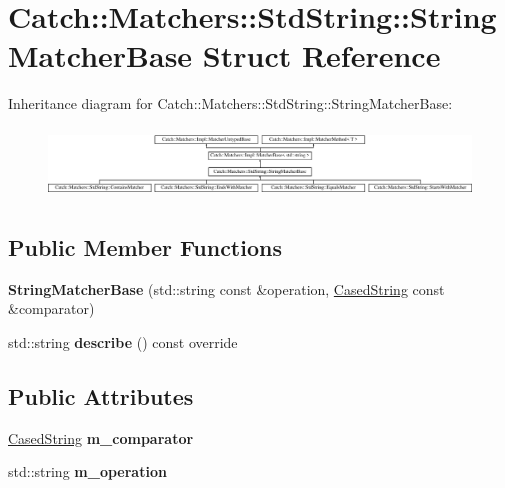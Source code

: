 \hypertarget{struct_catch_1_1_matchers_1_1_std_string_1_1_string_matcher_base}{}\section{Catch\+:\+:Matchers\+:\+:Std\+String\+:\+:String\+Matcher\+Base Struct Reference}
\label{struct_catch_1_1_matchers_1_1_std_string_1_1_string_matcher_base}
Inheritance diagram for Catch\+:\+:Matchers\+:\+:Std\+String\+:\+:String\+Matcher\+Base\+:\begin{figure}[H]
\begin{center}
\leavevmode
\includegraphics[height=1.879195cm]{struct_catch_1_1_matchers_1_1_std_string_1_1_string_matcher_base}
\end{center}
\end{figure}
\subsection*{Public Member Functions}
\begin{DoxyCompactItemize}
\item 
\mbox{\label{struct_catch_1_1_matchers_1_1_std_string_1_1_string_matcher_base_a3a9b66bae298ae27058478529b4bb39d}} 
{\bfseries String\+Matcher\+Base} (std\+::string const \&operation, \mbox{\hyperlink{struct_catch_1_1_matchers_1_1_std_string_1_1_cased_string}{Cased\+String}} const \&comparator)
\item 
\mbox{\label{struct_catch_1_1_matchers_1_1_std_string_1_1_string_matcher_base_a47af030f8cea42a601ffb1000eea5cca}} 
std\+::string {\bfseries describe} () const override
\end{DoxyCompactItemize}
\subsection*{Public Attributes}
\begin{DoxyCompactItemize}
\item 
\mbox{\label{struct_catch_1_1_matchers_1_1_std_string_1_1_string_matcher_base_a17c9f0fe40587070ffe998c193742831}} 
\mbox{\hyperlink{struct_catch_1_1_matchers_1_1_std_string_1_1_cased_string}{Cased\+String}} {\bfseries m\+\_\+comparator}
\item 
\mbox{\label{struct_catch_1_1_matchers_1_1_std_string_1_1_string_matcher_base_a7a25c4b7d863e9a1c406d81efd0f83ca}} 
std\+::string {\bfseries m\+\_\+operation}
\end{DoxyCompactItemize}
